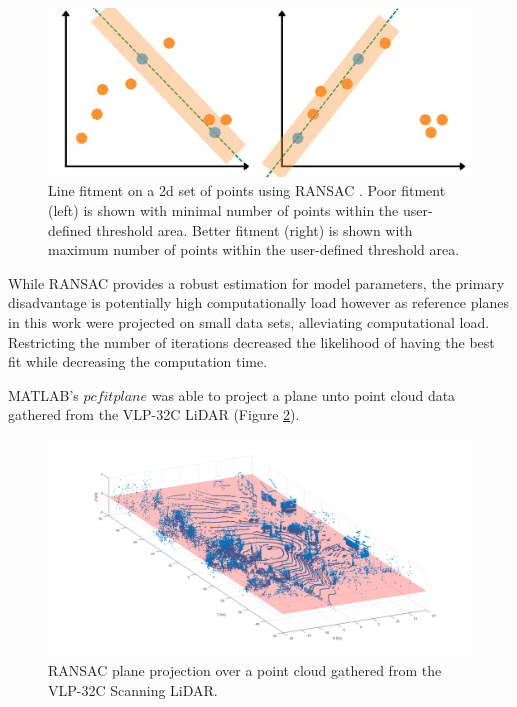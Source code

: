 \documentclass[numbered,pdftex]{ohio-etd}
\begin{document}
{{		\begin{figure}[H]
			\centering
			\includegraphics[width=0.7\linewidth]{Defense_Images/RANSAC_good_and_bad.png}
			\caption[2D Simplified RANSAC Example]{Line fitment on a 2d set of points using RANSAC \cite{alam_using_2022}. Poor fitment (left) is shown with minimal number of points within the user-defined threshold area. Better fitment (right) is shown with maximum number of points within the user-defined threshold area.}
			\label{fig:Ransac_2D_Example}
		\end{figure}

		{While RANSAC provides a robust estimation for model parameters, the primary disadvantage is potentially high computationally load \cite{yaniv_random_2010} however as reference planes in this work were projected on small data sets, alleviating computational load. Restricting the number of iterations decreased the likelihood of having the best fit while decreasing the computation time.}
	
		{MATLAB's $pcfitplane$ was able to project a plane unto point cloud data gathered from the VLP-32C LiDAR (Figure \ref{fig:RANSAC_example_proj}).}
		
		\begin{figure}[H]
			\centering
			\includegraphics[width=0.7\linewidth]{Defense_Images/RANSAC_example_proj.png}
			\caption[RANSAC Plane Projection Example]{RANSAC plane projection over a point cloud gathered from the VLP-32C Scanning LiDAR.}
			\label{fig:RANSAC_example_proj}
		\end{figure}
		
	} %
	
}
\end{document}

